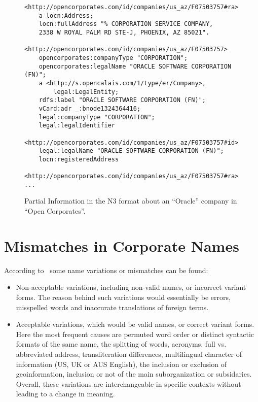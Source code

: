 \documentclass{llncs}
\begin{document}
\begin{itemize}
\begin{figure}[!h]
\begin{center}
\begin{lstlisting}[language=SPARQL]
<http://opencorporates.com/id/companies/us_az/F07503757#ra> 
	a locn:Address;
	locn:fullAddress "% CORPORATION SERVICE COMPANY, 
	2338 W ROYAL PALM RD STE-J, PHOENIX, AZ 85021".

<http://opencorporates.com/id/companies/us_az/F07503757> 
	opencorporates:companyType "CORPORATION";
	opencorporates:legalName "ORACLE SOFTWARE CORPORATION (FN)";
	a <http://s.opencalais.com/1/type/er/Company>,
		legal:LegalEntity;
	rdfs:label "ORACLE SOFTWARE CORPORATION (FN)";
	vCard:adr _:bnode1324364416;
	legal:companyType "CORPORATION";
	legal:legalIdentifier 
	  <http://opencorporates.com/id/companies/us_az/F07503757#id>;
	legal:legalName "ORACLE SOFTWARE CORPORATION (FN)";
	locn:registeredAddress 
	  <http://opencorporates.com/id/companies/us_az/F07503757#ra>.
...
\end{lstlisting}
\caption{Partial Information in the N3 format about an ``Oracle'' company in ``Open Corporates''.}
\label{figure:open}
\end{center}
\end{figure}
 
 
\end{itemize}


\section{Mismatches in Corporate Names}
According to~\cite{Galvez2006,Morillo:2013:TAA:2424697.2424727} some name variations or mismatches can be found:

\begin{itemize}
 \item Non-acceptable variations, including non-valid names, or incorrect
variant forms. The reason behind such variations would essentially be
errors, misspelled words and inaccurate translations of foreign terms.

\item Acceptable variations, which would be valid names, or correct variant
forms. Here the most frequent causes are permuted word order or distinct
syntactic formats of the same name, the splitting of words, acronyms, full
vs. abbreviated address, transliteration differences, multilingual character 
of information (US, UK or AUS English), the inclusion or exclusion of geoinformation, 
inclusion or not of the main suborganization or subsidaries. Overall, these variations are 
interchangeable in specific contexts without leading to a change in meaning.
\end{itemize}
\end{document}
